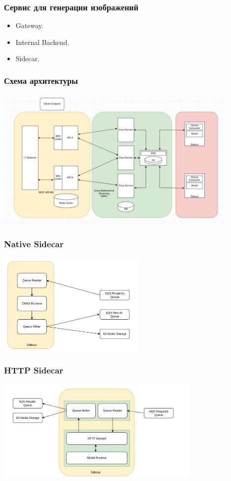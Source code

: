 \documentclass{beamer}
\begin{document}
\begin{frame}
	\frametitle{Сервис для генерации изображений}
	\begin{itemize}
		\item Gateway.
		\item Internal Backend.
        \item Sidecar.
	\end{itemize}
\end{frame}

\begin{frame}
	\frametitle{Схема архитектуры}
	\centering
	\includegraphics[height=7cm]{img/design.png}
\end{frame}

\begin{frame}
	\frametitle{Native Sidecar}
	\centering
	\includegraphics[height=5cm]{img/side1.jpg}
\end{frame}

\begin{frame}
	\frametitle{HTTP Sidecar}
	\centering
	\includegraphics[height=5cm]{img/side2.jpg}
\end{frame}
\end{document}
